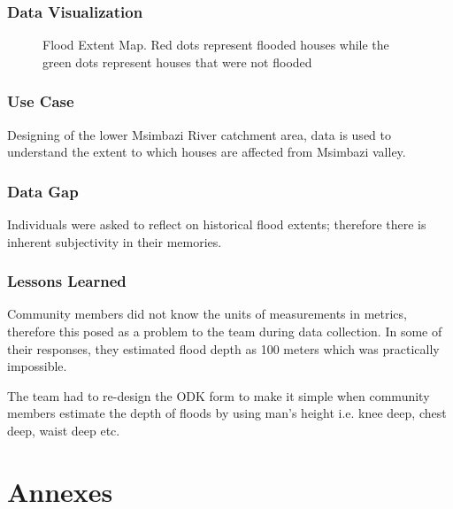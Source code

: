 \documentclass[a4paper,12pt,twoside]{article}
\begin{document}
\subsubsection{Data Visualization}
\begin{figure}[h]
  \color{RHgreen}\caption{Flood Extent Map. Red dots represent flooded houses while the green dots represent houses that were not flooded}
  \centering
\end{figure}

\subsubsection{Use Case}
Designing of the lower Msimbazi River catchment area, data is used to understand the extent to which houses are affected from Msimbazi valley.

\subsubsection{Data Gap}
Individuals were asked to reflect on historical flood extents; therefore there is inherent subjectivity in their memories.

\subsubsection{Lessons Learned}
Community members did not know the units of measurements in metrics, therefore this posed as a problem to the team during data collection. In some of their responses, they estimated flood depth as 100 meters which was practically impossible.
\medskip

The team had to re-design the ODK form to make it simple when community members estimate the depth of floods by using man’s height i.e. knee deep, chest deep, waist deep etc.



\newpage
\section{Annexes}
\end{document}
